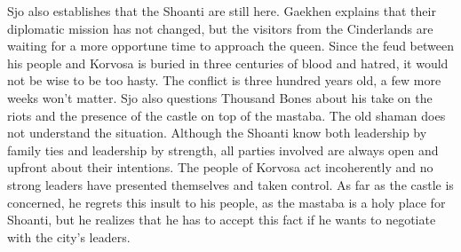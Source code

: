 Sjo also establishes that the Shoanti are still here. Gaekhen explains that their diplomatic mission has not changed, but the visitors from the Cinderlands are waiting for a more opportune time to approach the queen. Since the feud between his people and Korvosa is buried in three centuries of blood and hatred, it would not be wise to be too hasty. The conflict is three hundred years old, a few more weeks won't matter. Sjo also questions Thousand Bones about his take on the riots and the presence of the castle on top of the mastaba. The old shaman does not understand the situation. Although the Shoanti know both leadership by family ties and leadership by strength, all parties involved are always open and upfront about their intentions. The people of Korvosa act incoherently and no strong leaders have presented themselves and taken control. As far as the castle is concerned, he regrets this insult to his people, as the mastaba is a holy place for Shoanti, but he realizes that he has to accept this fact if he wants to negotiate with the city's leaders.\\

